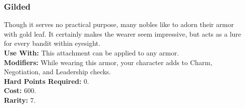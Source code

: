 \subsubsection{Gilded}
Though it serves no practical purpose, many nobles like to adorn their armor with gold leaf. It certainly makes the wearer seem impressive, but acts as a lure for every bandit within eyesight.\\
\textbf{Use With:} This attachment can be applied to any armor.\\
\textbf{Modifiers:} While wearing this armor, your character adds \boost to Charm, Negotiation, and Leadership checks.\\
\textbf{Hard Points Required:} 0.\\
\textbf{Cost:} 600.\\
\textbf{Rarity:} 7.\\
